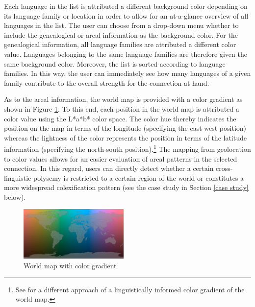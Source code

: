 
Each language in the list is attributed a different background color depending on its language family or location in order to allow for an at-a-glance overview of all languages in the list. The user can choose from a drop-down menu whether to include the genealogical or areal information as the background color. For the genealogical information, all language families are attributed a different color value. Languages belonging to the same language families are therefore given the same background color. Moreover, the list is sorted according to language families. In this way, the user can immediately see how many languages of  a given family contribute to the overall strength for the connection at hand. 

As to the areal information, the world map is provided with a color gradient as shown in Figure \ref{World map}. To this end, each position in the world map is attributed a color value using the L*a*b* color space. The color hue thereby indicates the position on the map in terms of the longitude (specifying the east-west position) whereas the lightness of the color represents the position in terms of the latitude information (specifying the north-south position).\footnote{See \cite{MayerLanguageExplorer} for a different approach of a linguistically informed color gradient of the world map.}
The mapping from geolocation to color values allows for an easier evaluation of areal patterns in the selected connection. In this regard, users can directly detect whether a certain cross-linguistic polysemy is restricted to a certain region of the world or constitutes a more widespread colexification pattern (see the case study in Section \ref{case study} below).

\begin{figure}[htbp]
\begin{center}
\includegraphics[width=0.48\textwidth]{img/ColorScaleWorld.png}
\caption{World map with color gradient}
\label{World map}
\end{center}
\end{figure}



